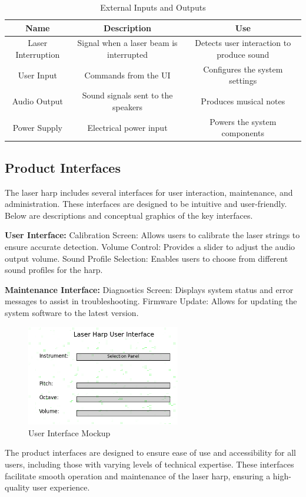 \begin{table}[H]
\centering
\begin{tabular}{|c|c|c|}
\hline
\textbf{Name} & \textbf{Description} & \textbf{Use} \\ \hline
Laser Interruption & Signal when a laser beam is interrupted & Detects user interaction to produce sound \\ \hline
User Input & Commands from the UI & Configures the system settings \\ \hline
Audio Output & Sound signals sent to the speakers & Produces musical notes \\ \hline
Power Supply & Electrical power input & Powers the system components \\ \hline
\end{tabular}
\caption{External Inputs and Outputs}
\end{table}

\subsection{Product Interfaces}
The laser harp includes several interfaces for user interaction, maintenance, and administration. These interfaces are designed to be intuitive and user-friendly. Below are descriptions and conceptual graphics of the key interfaces.

\textbf{User Interface:}
Calibration Screen: Allows users to calibrate the laser strings to ensure accurate detection.
Volume Control: Provides a slider to adjust the audio output volume.
Sound Profile Selection: Enables users to choose from different sound profiles for the harp.

\textbf{Maintenance Interface:}
Diagnostics Screen: Displays system status and error messages to assist in troubleshooting.
Firmware Update: Allows for updating the system software to the latest version.

\begin{figure}[h!]
	\centering
   	\includegraphics[width=0.60\textwidth]{images/UI}
    \caption{User Interface Mockup}
\end{figure}

The product interfaces are designed to ensure ease of use and accessibility for all users, including those with varying levels of technical expertise. These interfaces facilitate smooth operation and maintenance of the laser harp, ensuring a high-quality user experience.
